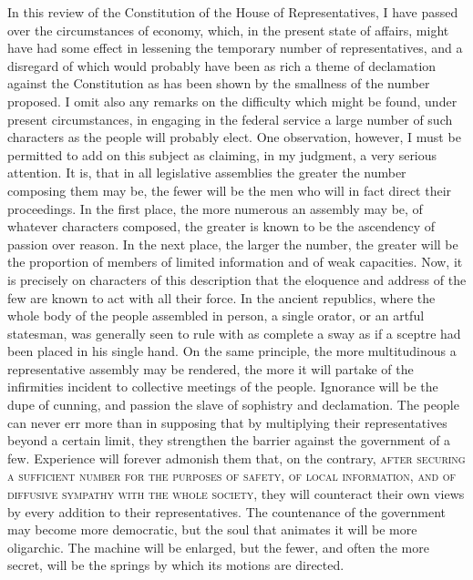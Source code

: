 In this review of the Constitution of the House of Representatives, I have passed over the circumstances of economy, which, in the present state of affairs, might have had some effect in lessening the temporary number of representatives, and a disregard of which would probably have been as rich a theme of declamation against the Constitution as has been shown by the smallness of the number proposed. I omit also any remarks on the difficulty which might be found, under present circumstances, in engaging in the federal service a large number of such characters as the people will probably elect. One observation, however, I must be permitted to add on this subject as claiming, in my judgment, a very serious attention. It is, that in all legislative assemblies the greater the number composing them may be, the fewer will be the men who will in fact direct their proceedings. In the first place, the more numerous an assembly may be, of whatever characters composed, the greater is known to be the ascendency of passion over reason. In the next place, the larger the number, the greater will be the proportion of members of limited information and of weak capacities. Now, it is precisely on characters of this description that the eloquence and address of the few are known to act with all their force. In the ancient republics, where the whole body of the people assembled in person, a single orator, or an artful statesman, was generally seen to rule with as complete a sway as if a sceptre had been placed in his single hand. On the same principle, the more multitudinous a representative assembly may be rendered, the more it will partake of the infirmities incident to collective meetings of the people. Ignorance will be the dupe of cunning, and passion the slave of sophistry and declamation. The people can never err more than in supposing that by multiplying their representatives beyond a certain limit, they strengthen the barrier against the government of a few. Experience will forever admonish them that, on the contrary, \textsc{after securing a sufficient number for the purposes of safety}, \textsc{of local information}, \textsc{and of diffusive sympathy with the whole society}, they will counteract their own views by every addition to their representatives. The countenance of the government may become more democratic, but the soul that animates it will be more oligarchic. The machine will be enlarged, but the fewer, and often the more secret, will be the springs by which its motions are directed.

